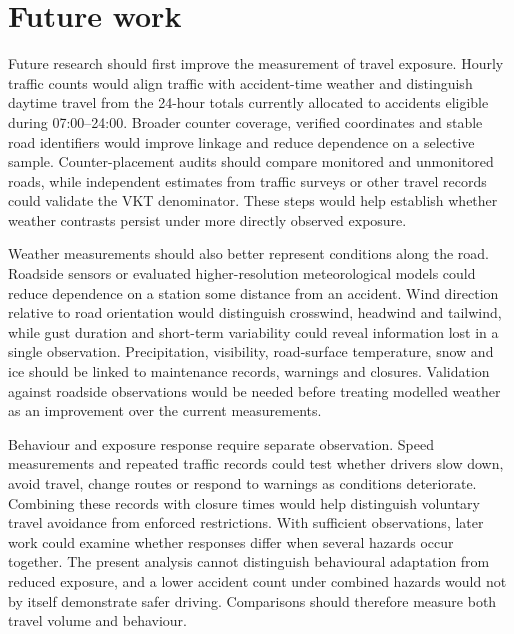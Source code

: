 \section{Future work}

Future research should first improve the measurement of travel exposure. Hourly traffic counts would align traffic with accident-time weather and distinguish daytime travel from the 24-hour totals currently allocated to accidents eligible during 07:00--24:00. Broader counter coverage, verified coordinates and stable road identifiers would improve linkage and reduce dependence on a selective sample. Counter-placement audits should compare monitored and unmonitored roads, while independent estimates from traffic surveys or other travel records could validate the VKT denominator. These steps would help establish whether weather contrasts persist under more directly observed exposure.

Weather measurements should also better represent conditions along the road. Roadside sensors or evaluated higher-resolution meteorological models could reduce dependence on a station some distance from an accident. Wind direction relative to road orientation would distinguish crosswind, headwind and tailwind, while gust duration and short-term variability could reveal information lost in a single observation. Precipitation, visibility, road-surface temperature, snow and ice should be linked to maintenance records, warnings and closures. Validation against roadside observations would be needed before treating modelled weather as an improvement over the current measurements.

Behaviour and exposure response require separate observation. Speed measurements and repeated traffic records could test whether drivers slow down, avoid travel, change routes or respond to warnings as conditions deteriorate. Combining these records with closure times would help distinguish voluntary travel avoidance from enforced restrictions. With sufficient observations, later work could examine whether responses differ when several hazards occur together. The present analysis cannot distinguish behavioural adaptation from reduced exposure, and a lower accident count under combined hazards would not by itself demonstrate safer driving. Comparisons should therefore measure both travel volume and behaviour.

